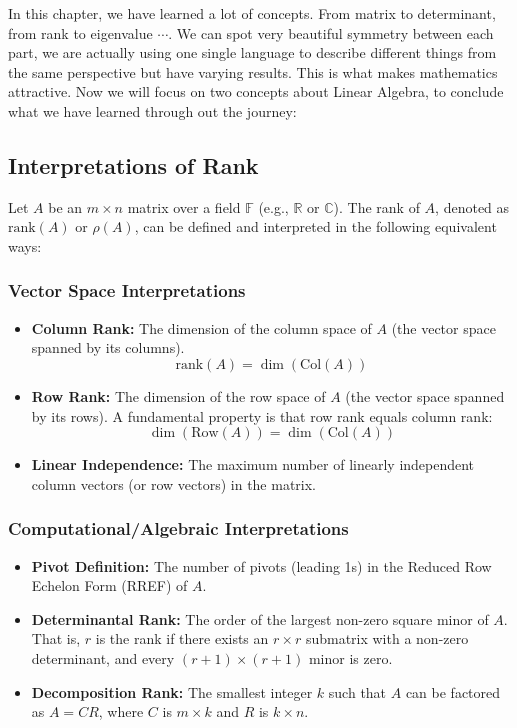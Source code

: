 \documentclass[oneside]{book}
\begin{document}
In this chapter, we have learned a lot of concepts. From matrix to determinant, from rank to eigenvalue $\cdots$. We can spot very beautiful symmetry between each part, we are actually using one single language to describe different things from the same perspective but have varying results. This is what makes mathematics attractive. Now we will focus on two concepts about Linear Algebra, to conclude what we have learned through out the journey:

\subsection{Interpretations of Rank}

Let $A$ be an $m \times n$ matrix over a field $\mathbb{F}$ (e.g., $\mathbb{R}$ or $\mathbb{C}$). The rank of $A$, denoted as $\text{rank}(A)$ or $\rho(A)$, can be defined and interpreted in the following equivalent ways:

\subsubsection{Vector Space Interpretations}
\begin{itemize}
    \item \textbf{Column Rank:} The dimension of the column space of $A$ (the vector space spanned by its columns).
    \[ \text{rank}(A) = \dim(\text{Col}(A)) \]
    \item \textbf{Row Rank:} The dimension of the row space of $A$ (the vector space spanned by its rows). A fundamental property is that row rank equals column rank:
    \[ \dim(\text{Row}(A)) = \dim(\text{Col}(A)) \]
    \item \textbf{Linear Independence:} The maximum number of linearly independent column vectors (or row vectors) in the matrix.
\end{itemize}

\subsubsection{Computational/Algebraic Interpretations}
\begin{itemize}
    \item \textbf{Pivot Definition:} The number of pivots (leading 1s) in the Reduced Row Echelon Form (RREF) of $A$.
    \item \textbf{Determinantal Rank:} The order of the largest non-zero square minor of $A$. That is, $r$ is the rank if there exists an $r \times r$ submatrix with a non-zero determinant, and every $(r+1) \times (r+1)$ minor is zero.
    \item \textbf{Decomposition Rank:} The smallest integer $k$ such that $A$ can be factored as $A = CR$, where $C$ is $m \times k$ and $R$ is $k \times n$.
\end{itemize}
\end{document}
